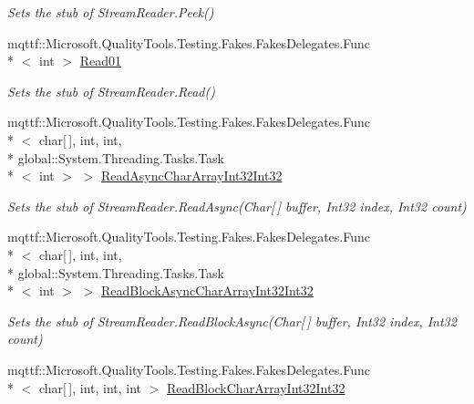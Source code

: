 \begin{DoxyCompactItemize}
\begin{DoxyCompactList}\small\item\em Sets the stub of Stream\-Reader.\-Peek()\end{DoxyCompactList}\item 
mqttf\-::\-Microsoft.\-Quality\-Tools.\-Testing.\-Fakes.\-Fakes\-Delegates.\-Func\\*
$<$ int $>$ \hyperlink{class_system_1_1_i_o_1_1_fakes_1_1_stub_stream_reader_aa6682b3c662e64a81118422427d6e9f1}{Read01}
\begin{DoxyCompactList}\small\item\em Sets the stub of Stream\-Reader.\-Read()\end{DoxyCompactList}\item 
mqttf\-::\-Microsoft.\-Quality\-Tools.\-Testing.\-Fakes.\-Fakes\-Delegates.\-Func\\*
$<$ char\mbox{[}$\,$\mbox{]}, int, int, \\*
global\-::\-System.\-Threading.\-Tasks.\-Task\\*
$<$ int $>$ $>$ \hyperlink{class_system_1_1_i_o_1_1_fakes_1_1_stub_stream_reader_a3f8fe202bc0946fc7990e6c33441e034}{Read\-Async\-Char\-Array\-Int32\-Int32}
\begin{DoxyCompactList}\small\item\em Sets the stub of Stream\-Reader.\-Read\-Async(\-Char\mbox{[}$\,$\mbox{]} buffer, Int32 index, Int32 count)\end{DoxyCompactList}\item 
mqttf\-::\-Microsoft.\-Quality\-Tools.\-Testing.\-Fakes.\-Fakes\-Delegates.\-Func\\*
$<$ char\mbox{[}$\,$\mbox{]}, int, int, \\*
global\-::\-System.\-Threading.\-Tasks.\-Task\\*
$<$ int $>$ $>$ \hyperlink{class_system_1_1_i_o_1_1_fakes_1_1_stub_stream_reader_aa9c625c692465d8dbc2432cd7d784add}{Read\-Block\-Async\-Char\-Array\-Int32\-Int32}
\begin{DoxyCompactList}\small\item\em Sets the stub of Stream\-Reader.\-Read\-Block\-Async(\-Char\mbox{[}$\,$\mbox{]} buffer, Int32 index, Int32 count)\end{DoxyCompactList}\item 
mqttf\-::\-Microsoft.\-Quality\-Tools.\-Testing.\-Fakes.\-Fakes\-Delegates.\-Func\\*
$<$ char\mbox{[}$\,$\mbox{]}, int, int, int $>$ \hyperlink{class_system_1_1_i_o_1_1_fakes_1_1_stub_stream_reader_afb7db40473d45423b575b9470c41a94d}{Read\-Block\-Char\-Array\-Int32\-Int32}

\end{DoxyCompactItemize}
